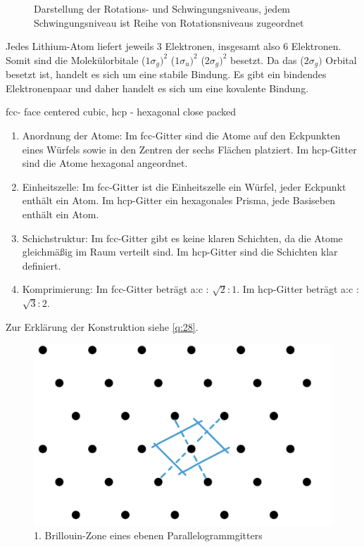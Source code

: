 \begin{figure}[H]
\begin{minipage}[b]{.4\linewidth}
      \caption{Darstellung der Rotations- und Schwingungsniveaus, jedem Schwingungsniveau ist Reihe von Rotationsniveaus zugeordnet}
   \end{minipage}
    \end{figure}
\label{q:44}
Jedes Lithium-Atom liefert jeweils 3 Elektronen, insgesamt also 6 Elektronen. 
Somit sind die Molekülorbitale ($1\sigma_g)^2$ ($1\sigma_u)^2$ ($2\sigma_g)^2$ besetzt. 
Da das ($2\sigma_g)$ Orbital besetzt ist, handelt es sich um eine stabile Bindung. 
Es gibt ein bindendes Elektronenpaar und daher handelt es sich um eine kovalente Bindung.

\label{q:45}

\label{q:46}

fcc- face centered cubic, hcp - hexagonal close packed

\begin{enumerate}
    \item Anordnung der Atome: Im fcc-Gitter sind die Atome auf den Eckpunkten eines Würfels sowie in den Zentren der sechs Flächen platziert. Im hcp-Gitter sind die Atome hexagonal angeordnet.
    \item Einheitszelle: Im fcc-Gitter ist die Einheitszelle ein Würfel, jeder Eckpunkt enthält ein Atom. Im hcp-Gitter ein hexagonales Prisma, jede Basiseben enthält ein Atom.
    \item Schichstruktur: Im fcc-Gitter gibt es keine klaren Schichten, da die Atome gleichmäßig im Raum verteilt sind. Im hcp-Gitter sind die Schichten klar definiert.
    \item Komprimierung: Im fcc-Gitter beträgt a:c : $\sqrt{2}:1$. Im hcp-Gitter beträgt a:c : $\sqrt{3}:2$.
\end{enumerate}

\label{q:47}

\label{q:48}

Zur Erklärung der Konstruktion siehe \autoref{q:28}.
\begin{figure}[H]
    \centering
    \begin{samepage}
        \includegraphics[width=0.4\linewidth]{resources/16-03-2012/BZ1.png}
        \caption[BZ1 Parallelogrammgitter]{1. Brillouin-Zone eines ebenen Parallelogrammgitters}
        \label{fig:BZ1_Parallelogrammgitter}
    \end{samepage}
\end{figure}

